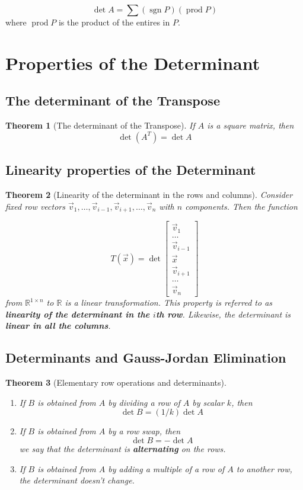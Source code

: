\documentclass[letter]{article}
\newcommand{\R}{\mathbb{R}}
\newtheorem{theorem}{Theorem}[section]
\newenvironment{definition}[1][Definition]{\begin{trivlist}
\item[\hskip \labelsep {\bfseries #1}]}{\end{trivlist}}
\begin{document}
\begin{definition}
\[ \det A = \sum (\operatorname{sgn} P) (\operatorname{prod} P) \]
where $\operatorname{prod} P$ is the product of the entires in $P$.
\end{definition}

\section{Properties of the Determinant}
\subsection{The determinant of the Transpose}
\begin{theorem}[The determinant of the Transpose]
If $A$ is a square matrix, then
\[
\det(A^T) = \det A
\]
\end{theorem}

\subsection{Linearity properties of the Determinant}
\begin{theorem}[Linearity of the determinant in the rows and columns]
Consider fixed row vectors $\vec v_1, \ldots, \vec v_{i-1}, \vec v_{i+1},\ldots,\vec v_n$ with $n$ components. Then the function

\[T(\vec x) = \det 
\begin{bmatrix}
\vec v_1\\
\ldots\\
\vec v_{i-1}\\
\vec x\\
\vec v_{i+1}\\
\ldots\\
\vec v_n
\end{bmatrix}
\]
from $\R^{1\times n}$ to $\R$ is a linear transformation. This property is referred to as \textbf{linearity of the determinant in the $i$th row}. Likewise, the determinant is \textbf{linear in all the columns}.
\end{theorem}

\subsection{Determinants and Gauss-Jordan Elimination}
\begin{theorem}[Elementary row operations and determinants]
\begin{enumerate}
\item If $B$ is obtained from $A$ by dividing a row of $A$ by scalar $k$, then
\[
\det B = (1/k) \det A
\]
\item If $B$ is obtained from $A$ by a row swap, then
\[
\det B = - \det A
\]
we say that the determinant is \textbf{alternating} on the rows.
\item If $B$ is obtained from $A$ by adding a multiple of a row of $A$ to another row, the determinant doesn't change.
\end{enumerate}
\end{theorem}
\end{document}
